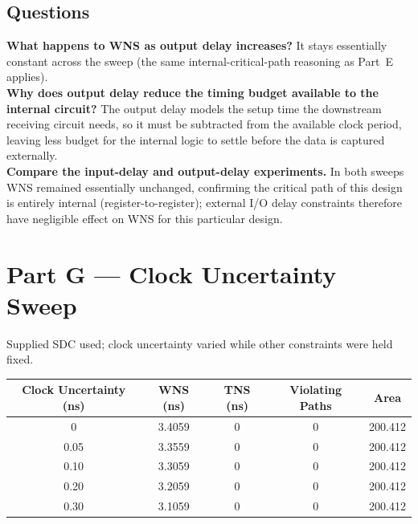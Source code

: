 \documentclass[11pt]{article}
\begin{document}
\subsection*{Questions}
\textbf{What happens to WNS as output delay increases?} It stays essentially constant across the
sweep (the same internal-critical-path reasoning as Part~E applies).\\
\textbf{Why does output delay reduce the timing budget available to the internal circuit?} The
output delay models the setup time the downstream receiving circuit needs, so it must be subtracted
from the available clock period, leaving less budget for the internal logic to settle before the
data is captured externally.\\
\textbf{Compare the input-delay and output-delay experiments.} In both sweeps WNS remained
essentially unchanged, confirming the critical path of this design is entirely internal
(register-to-register); external I/O delay constraints therefore have negligible effect on WNS for
this particular design.

\section{Part G --- Clock Uncertainty Sweep}
Supplied SDC used; clock uncertainty varied while other constraints were held fixed.
\begin{center}
\begin{tabular}{|c|c|c|c|c|}
\hline
\textbf{Clock Uncertainty (ns)} & \textbf{WNS (ns)} & \textbf{TNS (ns)} & \textbf{Violating Paths} & \textbf{Area} \\ \hline
0    & 3.4059 & 0 & 0 & 200.412 \\ \hline
0.05 & 3.3559 & 0 & 0 & 200.412 \\ \hline
0.10 & 3.3059 & 0 & 0 & 200.412 \\ \hline
0.20 & 3.2059 & 0 & 0 & 200.412 \\ \hline
0.30 & 3.1059 & 0 & 0 & 200.412 \\ \hline
\end{tabular}
\end{center}
\end{document}
